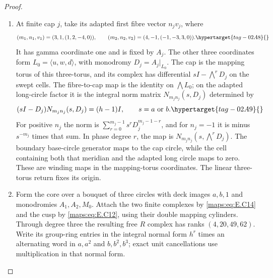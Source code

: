 \documentclass[11pt,a4paper]{article}
\numberwithin{equation}{section}
\theoremstyle{definition}
\begin{document}
\begin{proof}
\begin{enumerate}[label=\arabic*.,leftmargin=*]
\item At finite cap $j$, take its adapted first fibre vector
$n_jv_j$, where
\begin{equation}
 (m_1,n_1,v_1)=(3,1,(1,2,-4,0)),\qquad
 (m_2,n_2,v_2)=(4,-1,(-1,-3,3,0)).
 \hypertarget{tag-02A8}{}\label{maps:eq:E.C13}
\end{equation}
It has gamma coordinate one and is fixed by $A_j$.
The other three coordinates form $L_0=\langle u,w,d\rangle$,
with monodromy $D_j=A_j|_{L_0}$. The cap is the
mapping torus of this three-torus, and its complex has
differential $sI-\bigwedge^rD_j$ on the swept cells.
The fibre-to-cap map is the identity on $\bigwedge L_0$;
on the adapted long-circle factor it is the integral
norm matrix $N_{m_jn_j}(s,D_j)$ determined by
\begin{equation}
 (sI-D_j)N_{m_jn_j}(s,D_j)=(h-1)I,
 \qquad s=a\text{ or }b.
 \hypertarget{tag-02A9}{}\label{maps:eq:E.C14}
\end{equation}
For positive $n_j$ the norm is
$\sum_{r=0}^{m_j-1}s^rD_j^{m_j-1-r}$, and for
$n_j=-1$ it is minus $s^{-m_j}$ times that sum.
In phase degree $r$, the map is
$N_{m_jn_j}(s,\bigwedge^rD_j)$.
The boundary base-circle generator maps to the cap circle, while
the cell containing both that meridian and the adapted
long circle maps to zero. These are winding
maps in the mapping-torus coordinates. The linear three-torus return fixes its origin.

\item Form the core over a bouquet of three circles with
deck images $a,b,1$ and monodromies $A_1,A_2,M_0$.
Attach the two finite complexes by \eqref{maps:eq:E.C14} and the
cusp by \eqref{maps:eq:E.C12}, using their double mapping cylinders.
Through degree three the resulting free $R$ complex
has ranks $(4,20,49,62)$. Write its group-ring entries in the integral normal form $h^r$ times
an alternating word in $a,a^2$ and $b,b^2,b^3$; exact unit
cancellations use multiplication in that normal form.


\end{enumerate}
\end{proof}
\end{document}
